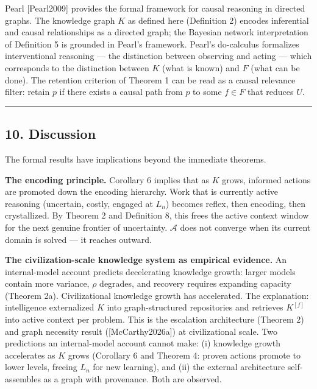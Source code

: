 \documentclass[
]{article}
\begin{document}
Pearl {[}Pearl2009{]} provides the formal framework for causal reasoning
in directed graphs. The knowledge graph \(K\) as defined here (Definition
2) encodes inferential and causal relationships as a directed graph; the
Bayesian network interpretation of Definition 5 is grounded in Pearl's
framework. Pearl's do-calculus formalizes interventional reasoning ---
the distinction between observing and acting --- which corresponds to
the distinction between \(K\) (what is known) and \(F\) (what can be
done). The retention criterion of Theorem 1 can be read as a
causal relevance filter: retain \(p\) if there exists a causal path
from \(p\) to some \(f \in F\) that reduces \(U\).

\begin{center}\rule{0.5\linewidth}{0.5pt}\end{center}

\subsection{10. Discussion}\label{discussion}

The formal results have implications beyond the immediate theorems.

\textbf{The encoding principle.} Corollary 6
implies that as \(K\) grows, informed actions are promoted
down the encoding hierarchy. Work that is currently active reasoning
(uncertain, costly, engaged at \(L_n\)) becomes reflex, then encoding,
then crystallized. By Theorem 2 and
Definition 8, this frees the active context window for the next genuine
frontier of uncertainty. \(\mathcal{A}\) does not converge when its
current domain is solved --- it reaches outward.

\textbf{The civilization-scale knowledge system as empirical evidence.}
An internal-model account predicts decelerating knowledge growth: larger
models contain more variance, \(\rho\) degrades, and recovery requires
expanding capacity (Theorem 2a). Civilizational knowledge growth has
accelerated. The explanation: intelligence externalized \(K\) into
graph-structured repositories and retrieves \(K^{[f]}\) into active
context per problem. This is the escalation architecture (Theorem 2) and
graph necessity result ({[}McCarthy2026a{]}) at civilizational scale. Two
predictions an internal-model account cannot make: (i) knowledge growth
accelerates as \(K\) grows (Corollary 6 and Theorem 4: proven actions
promote to lower levels, freeing \(L_n\) for new learning), and (ii) the
external
architecture self-assembles as a graph with provenance. Both are
observed.
\end{document}
